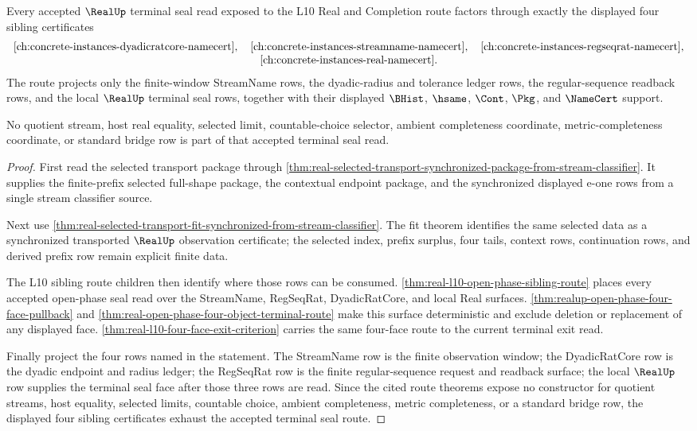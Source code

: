 \begin{theorem}
\label{thm:real-l10-route-sibling-exhaustion}
Every accepted $\RealUp$ terminal seal read exposed to the L10 Real and
Completion route factors through exactly the displayed four sibling
certificates
$$
\begin{array}{c}
\autoref{ch:concrete-instances-dyadicratcore-namecert},\quad
\autoref{ch:concrete-instances-streamname-namecert},\quad
\autoref{ch:concrete-instances-regseqrat-namecert},\\
\autoref{ch:concrete-instances-real-namecert}.
\end{array}
$$
The route projects only the finite-window StreamName rows, the dyadic-radius
and tolerance ledger rows, the regular-sequence readback rows, and the local
$\RealUp$ terminal seal rows, together with their displayed $\BHist$,
$\hsame$, $\Cont$, $\Pkg$, and $\NameCert$ support.

No quotient stream, host real equality, selected limit, countable-choice
selector, ambient completeness coordinate, metric-completeness coordinate, or
standard bridge row is part of that accepted terminal seal read.
\end{theorem}
\begin{proof}
First read the selected transport package through
\autoref{thm:real-selected-transport-synchronized-package-from-stream-classifier}.
It supplies the finite-prefix selected full-shape package, the contextual
endpoint package, and the synchronized displayed e-one rows from a single
stream classifier source.

Next use
\autoref{thm:real-selected-transport-fit-synchronized-from-stream-classifier}.
The fit theorem identifies the same selected data as a synchronized
transported $\RealUp$ observation certificate; the selected index, prefix
surplus, four tails, context rows, continuation rows, and derived prefix row
remain explicit finite data.

The L10 sibling route children then identify where those rows can be consumed.
\autoref{thm:real-l10-open-phase-sibling-route} places every accepted
open-phase seal read over the StreamName, RegSeqRat, DyadicRatCore, and local
Real surfaces. \autoref{thm:realup-open-phase-four-face-pullback} and
\autoref{thm:real-open-phase-four-object-terminal-route} make this surface
deterministic and exclude deletion or replacement of any displayed face.
\autoref{thm:real-l10-four-face-exit-criterion} carries the same four-face
route to the current terminal exit read.

Finally project the four rows named in the statement. The StreamName row is the
finite observation window; the DyadicRatCore row is the dyadic endpoint and
radius ledger; the RegSeqRat row is the finite regular-sequence request and
readback surface; the local $\RealUp$ row supplies the terminal seal face after
those three rows are read. Since the cited route theorems expose no constructor
for quotient streams, host equality, selected limits, countable choice, ambient
completeness, metric completeness, or a standard bridge row, the displayed four
sibling certificates exhaust the accepted terminal seal route.
\end{proof}

